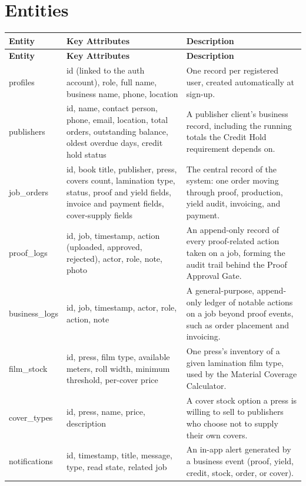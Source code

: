 \documentclass{scrreprt}
\begin{document}
\section{Entities}
\begin{longtable}{L{0.20\textwidth} L{0.40\textwidth} L{0.40\textwidth}}
\toprule
{} \textbf{Entity} & \textbf{Key Attributes} & \textbf{Description} \\
\midrule
\endfirsthead
\toprule
{} \textbf{Entity} & \textbf{Key Attributes} & \textbf{Description} \\
\midrule
\endhead
profiles & id (linked to the auth account), role, full name, business name, phone, location & One record per registered user, created automatically at sign-up. \\
publishers & id, name, contact person, phone, email, location, total orders, outstanding balance, oldest overdue days, credit hold status & A publisher client's business record, including the running totals the Credit Hold requirement depends on. \\
job_orders & id, book title, publisher, press, covers count, lamination type, status, proof and yield fields, invoice and payment fields, cover-supply fields & The central record of the system: one order moving through proof, production, yield audit, invoicing, and payment. \\
proof_logs & id, job, timestamp, action (uploaded, approved, rejected), actor, role, note, photo & An append-only record of every proof-related action taken on a job, forming the audit trail behind the Proof Approval Gate. \\
business_logs & id, job, timestamp, actor, role, action, note & A general-purpose, append-only ledger of notable actions on a job beyond proof events, such as order placement and invoicing. \\
film_stock & id, press, film type, available meters, roll width, minimum threshold, per-cover price & One press's inventory of a given lamination film type, used by the Material Coverage Calculator. \\
cover_types & id, press, name, price, description & A cover stock option a press is willing to sell to publishers who choose not to supply their own covers. \\
notifications & id, timestamp, title, message, type, read state, related job & An in-app alert generated by a business event (proof, yield, credit, stock, order, or cover). \\
\bottomrule
\end{longtable}
\end{document}
